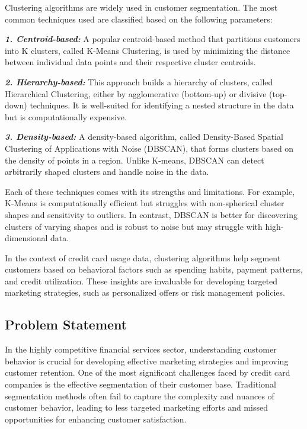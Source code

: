 \documentclass[runningheads,a4paper]{llncs}
\begin{document}
Clustering algorithms are widely used in customer segmentation. The most common techniques used are classified based on the following parameters:

\textbf{\emph{1. Centroid-based:}} A popular centroid-based method that partitions customers into K clusters, called K-Means Clustering, is used by minimizing the distance between individual data points and their respective cluster centroids.

\textbf{\emph{2. Hierarchy-based:}} This approach builds a hierarchy of clusters, called Hierarchical Clustering, either by agglomerative (bottom-up) or divisive (top-down) techniques. It is well-suited for identifying a nested structure in the data but is computationally expensive.

\textbf{\emph{3. Density-based:}} A density-based algorithm, called Density-Based Spatial Clustering of Applications with Noise (DBSCAN), that forms clusters based on the density of points in a region. Unlike K-means, DBSCAN can detect arbitrarily shaped clusters and handle noise in the data.

Each of these techniques comes with its strengths and limitations. For example, K-Means is computationally efficient but struggles with non-spherical cluster shapes and sensitivity to outliers. In contrast, DBSCAN is better for discovering clusters of varying shapes and is robust to noise but may struggle with high-dimensional data.

In the context of credit card usage data, clustering algorithms help segment customers based on behavioral factors such as spending habits, payment patterns, and credit utilization. These insights are invaluable for developing targeted marketing strategies, such as personalized offers or risk management policies.

\subsection{Problem Statement}

In the highly competitive financial services sector, understanding customer behavior is crucial for developing effective marketing strategies and improving customer retention. One of the most significant challenges faced by credit card companies is the effective segmentation of their customer base. Traditional segmentation methods often fail to capture the complexity and nuances of customer behavior, leading to less targeted marketing efforts and missed opportunities for enhancing customer satisfaction.
\end{document}
